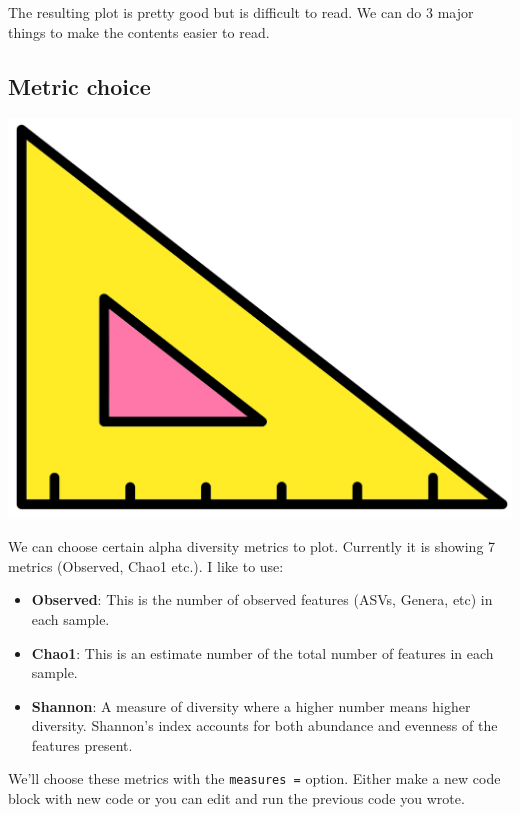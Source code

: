 \documentclass[
]{book}
\providecommand{\tightlist}{%
  \setlength{\itemsep}{0pt}\setlength{\parskip}{0pt}}
\begin{document}
The resulting plot is pretty good but is difficult to read.
We can do 3 major things to make the contents easier to read.

\hypertarget{metric-choice}{%
\subsection{Metric choice}\label{metric-choice}}

\includegraphics{figures/metric_square_1.png}

We can choose certain alpha diversity metrics to plot.
Currently it is showing 7 metrics (Observed, Chao1 etc.).
I like to use:

\begin{itemize}
\tightlist
\item
  \textbf{Observed}: This is the number of observed features (ASVs, Genera, etc) in each sample.
\item
  \textbf{Chao1}: This is an estimate number of the total number of features in each sample.
\item
  \textbf{Shannon}: A measure of diversity where a higher number means higher diversity. Shannon's index accounts for both abundance and evenness of the features present.
\end{itemize}

We'll choose these metrics with the \texttt{measures\ =} option.
Either make a new code block with new code or you can edit and run the previous code you wrote.
\end{document}
